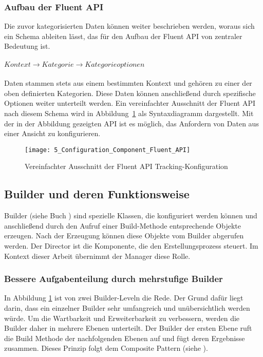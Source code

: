 \subsubsection{Aufbau der Fluent API}
Die zuvor kategorisierten Daten können weiter beschrieben werden, woraus sich ein Schema ableiten lässt, das für den Aufbau der Fluent API von zentraler Bedeutung ist.\\
\\
$Kontext \rightarrow Kategorie \rightarrow Kategorieoptionen$\\
\\
Daten stammen stets aus einem bestimmten Kontext und gehören zu einer der oben definierten Kategorien. Diese Daten können anschließend durch spezifische Optionen weiter unterteilt werden. Ein vereinfachter Ausschnitt der Fluent API nach diesem Schema wird in Abbildung~\ref{fig:configuration_component_fluent_api} als Syntaxdiagramm dargestellt. Mit der in der Abbildung gezeigten API ist es möglich, das Anfordern von Daten aus einer Ansicht zu konfigurieren.

\begin{figure}[H]
    \centering
    \texttt{[image: 5\_Configuration\_Component\_Fluent\_API]}
    \caption{Vereinfachter Ausschnitt der Fluent API Tracking-Konfiguration}
    \label{fig:configuration_component_fluent_api}
\end{figure}

\subsection{Builder und deren Funktionsweise}
Builder (siehe Buch \cite{sarcar2004design}) sind spezielle Klassen, die konfiguriert werden können und anschließend durch den Aufruf einer Build-Methode entsprechende Objekte erzeugen. Nach der Erzeugung können diese Objekte vom Builder abgerufen werden. Der Director ist die Komponente, die den Erstellungsprozess steuert. Im Kontext dieser Arbeit übernimmt der Manager diese Rolle.

\subsubsection{Bessere Aufgabenteilung durch mehrstufige Builder}
In Abbildung \ref{fig:configuration_component_fluent_api} ist von zwei Builder-Leveln die Rede. Der Grund dafür liegt darin, dass ein einzelner Builder sehr umfangreich und unübersichtlich werden würde. Um die Wartbarkeit und Erweiterbarkeit zu verbessern, werden die Builder daher in mehrere Ebenen unterteilt.  
Der Builder der ersten Ebene ruft die Build Methode der nachfolgenden Ebenen auf und fügt deren Ergebnisse zusammen. Dieses Prinzip folgt dem Composite Pattern (siehe \cite{gamma1995design}).

